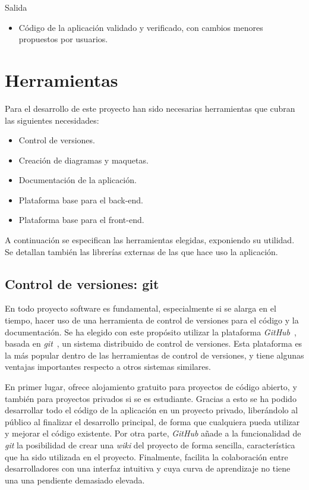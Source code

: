 Salida
\begin{itemize}[leftmargin=3.5em]
  \item Código de la aplicación validado y verificado, con cambios menores propuestos por usuarios.
\end{itemize}


\section{Herramientas\label{sec:dp:herramientas}}

Para el desarrollo de este proyecto han sido necesarias herramientas que cubran las siguientes necesidades:

\begin{itemize}
  \item Control de versiones.
  \item Creación de diagramas y maquetas.
  \item Documentación de la aplicación.
  \item Plataforma base para el \gls{back-end}.
  \item Plataforma base para el \gls{front-end}.
\end{itemize}

A continuación se especifican las herramientas elegidas, exponiendo su utilidad.
Se detallan también las librerías externas de las que hace uso la aplicación.

\subsection*{Control de versiones: git\label{ssec:dp:git}}

En todo proyecto software es fundamental, especialmente si se alarga en el tiempo, hacer uso de una herramienta de control de versiones para el código y la documentación. Se ha elegido con este propósito utilizar la plataforma \textit{GitHub}~\cite{github}, basada en \textit{git}~\cite{git}, un sistema distribuido de control de versiones.
Esta plataforma es la más popular dentro de las herramientas de control de versiones, y tiene algunas ventajas importantes respecto a otros sistemas similares.

En primer lugar, ofrece alojamiento gratuito para proyectos de código abierto, y también para proyectos privados si se es estudiante. Gracias a esto se ha podido desarrollar todo el código de la aplicación en un proyecto privado, liberándolo al público al finalizar el desarrollo principal, de forma que cualquiera pueda utilizar y mejorar el código existente.
Por otra parte, \textit{GitHub} añade a la funcionalidad de \textit{git} la posibilidad de crear una \textit{wiki} del proyecto de forma sencilla, característica que ha sido utilizada en el proyecto.
Finalmente, facilita la colaboración entre desarrolladores con una interfaz intuitiva y cuya curva de aprendizaje no tiene una una pendiente demasiado elevada.

